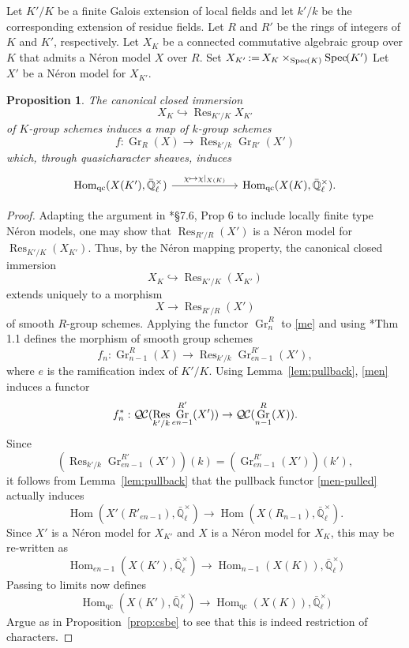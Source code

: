 \documentclass[CM,Submssn,SecEq]{degruyter-crelle} %
\theoremstyle{plain}
\newtheorem{proposition}[theorem]{Proposition}
\theoremstyle{definition}
\theoremstyle{remark}
\newcommand{\EE}{\mathbb{\bar Q}_\ell}
\newcommand{\Fq}{k}
\newcommand{\EEx}{\EE^\times}
\DeclareMathOperator{\Hom}{Hom}
\DeclareMathOperator{\Gr}{Gr}
\DeclareMathOperator{\Res}{Res}
\newcommand{\Spec}[1]{{\operatorname{Spec}\hskip-1pt( #1 )}}
\newcommand{\ceq}{{\, :=\, }}
\newcommand{\QC}{{\mathcal{Q\hskip-0.8pt C}}}
\begin{document}
Let $K'/K$ be a finite Galois extension of local fields and
let $k'/k$ be the corresponding extension of residue fields.
Let $R$ and $R'$ be the rings of integers of $K$ and $K'$, respectively.
Let $X_K$ be a connected commutative algebraic group over $K$
that admits a N\'eron model $X$ over $R$.
Set $X_{K'} \ceq X_K \times_\Spec{K} \Spec{K'}$
Let $X'$ be a N\'eron model for $X_{K'}$.

\begin{proposition}\label{prop:wrK}
The canonical closed immersion 
\[
X_K \hookrightarrow \Res_{K'/K} X_{K'}
\]
of $K$-group schemes
induces a map of $\Fq$-group schemes 
\[
f : \Gr_R(X) \to \Res_{k'/k} \Gr_{R'}(X')
\] 
which, through quasicharacter sheaves, induces
\[
\begin{tikzcd}[column sep=60]
\Hom_{\text{qc}}(X(K'), \EEx) \arrow{r}{\chi \mapsto \chi\vert_{X(K)}} &\Hom_{\text{qc}}(X(K), \EEx).
\end{tikzcd}
\]
\end{proposition}

\begin{proof}
Adapting the argument in \cite{bosch-lutkebohmert-reynaud:NeronModels}*{\S 7.6, Prop 6} to include locally finite type N\'eron models,
one may show that $\Res_{R'/R}(X')$ is a N\'eron model for $\Res_{K'/K}(X_{K'})$.
Thus, by the N\'eron mapping property, the canonical closed immersion
\[
X_K\hookrightarrow \Res_{K'/K}(X_{K'})
\]
 extends uniquely to a morphism
\begin{equation}\label{me}
X\to \Res_{R'/R}(X')
\end{equation}
 of smooth $R$-group schemes.
%
Applying the functor $\Gr^R_{n}$ to \eqref{me}
and using \cite{bertrapelle-gonzales:Greenberg}*{Thm 1.1} defines the morphism of smooth group schemes
\begin{equation}\label{men}
f_n: \Gr_{n-1}^R(X) \to \Res_{k'/k} \Gr_{en-1}^{R'}(X'),
\end{equation}
where $e$ is the ramification index of $K'/K$.
Using Lemma~\ref{lem:pullback}, \eqref{men} induces a functor 
\begin{equation}\label{men-pulled}
f_n^* : \QC(\Res_{k'/k} \Gr_{en-1}^{R'}(X'))\to \QC(\Gr_{n-1}^{R}(X)).
\end{equation}
Since 
\[
\left(\Res_{k'/k} \Gr_{en-1}^{R'}(X') \right)(\Fq) = \left(\Gr_{en-1}^{R'}(X')\right)(k'),
\]
it follows from Lemma~\ref{lem:pullback} that the pullback functor \eqref{men-pulled} actually induces
\[
\Hom(X'(R'_{en-1}),\EEx)  \to  \Hom(X(R_{n-1}),\EEx) .
\]
Since $X'$ is a N\'eron model for $X_{K'}$ and $X$ is a N\'eron model for $X_K$,
 this may be re-written as
\[ 
\Hom_{en-1}(X(K'),\EEx) \to \Hom_{n-1}(X(K)),\EEx)
\]
Passing to limits now defines
\[ 
\Hom_\text{qc}(X(K'),\EEx) \to \Hom_\text{qc}(X(K)),\EEx)
\]
Argue as in Proposition~\ref{prop:csbe} to see that this is indeed restriction of characters.
\end{proof}
\end{document}
